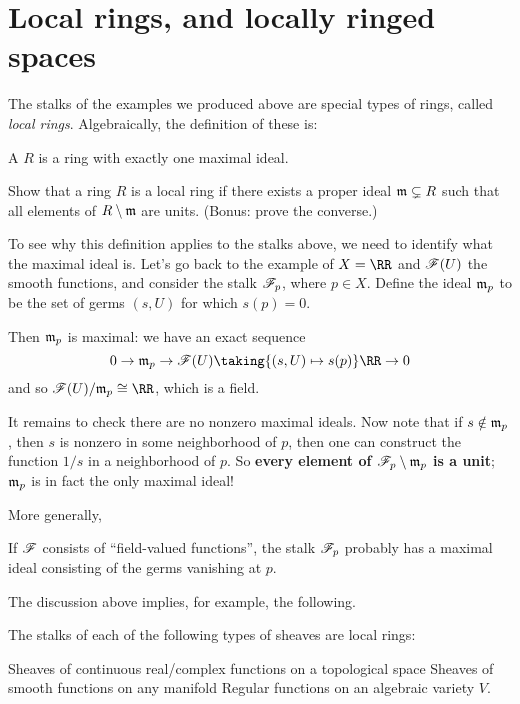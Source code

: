 \documentclass[11pt]{scrreprt}
\begin{document}
\section{Local rings, and locally ringed spaces}
The stalks of the examples we produced above are special types
of rings, called \emph{local rings}.
Algebraically, the definition of these is:
\begin{definition}
	A  $R$ is a ring with exactly one maximal ideal.
\end{definition}
\begin{exercise}
	Show that a ring $R$ is a local ring if there exists
	a proper ideal $\mathfrak m \subsetneq R$ such that
	all elements of $R \setminus \mathfrak m$ are units.
	(Bonus: prove the converse.)
\end{exercise}

To see why this definition applies to the stalks above,
we need to identify what the maximal ideal is.
Let's go back to the example of $X = \RR$ and $\mathscr F(U)$ the smooth functions,
and consider the stalk $\mathscr F_{p}$, where $p \in X$.
Define the ideal $\mathfrak m_p$ to be the set of germs $(s,U)$ for which $s(p) = 0$.

Then $\mathfrak m_p$ is maximal: we have an exact sequence
\[ 0 \to \mm_p \to \SF(U) \taking{(s,U) \mapsto s(p)} \RR \to 0 \]
and so $\SF(U) / \mm_p \cong \RR$, which is a field.

It remains to check there are no nonzero maximal ideals.
Now note that if $s \notin \mathfrak m_p$,
then $s$ is nonzero in some neighborhood of $p$,
then one can construct the function $1/s$ in a neighborhood of $p$.
So \textbf{every element of $\mathscr F_p \setminus \mathfrak m_p$ is a unit};
$\mathfrak m_p$ is in fact the only maximal ideal!

More generally,
\begin{moral}
	If $\mathscr F$ consists of ``field-valued functions'',
	the stalk $\mathscr F_p$ probably has a maximal ideal
	consisting of the germs vanishing at $p$.
\end{moral}
The discussion above implies, for example, the following.
\begin{proposition}
	The stalks of each of the following types of sheaves are local rings:
	\begin{enumerate}[(a)]
		\ii Sheaves of continuous real/complex functions on a topological space
		\ii Sheaves of smooth functions on any manifold
		\ii Regular functions on an algebraic variety $V$.
	\end{enumerate}
\end{proposition}
\end{document}
